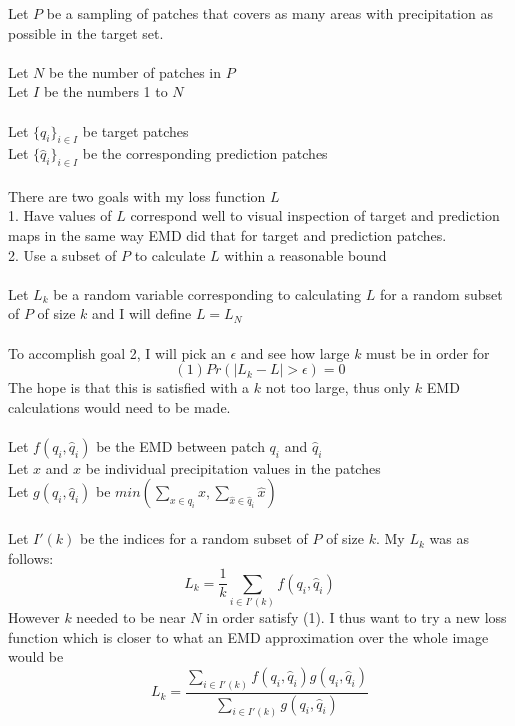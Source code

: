 \documentclass[twoside,11pt]{article}
\theoremstyle{definition}
\begin{document}
Let $P$ be a sampling of patches that covers as many areas with precipitation as possible in the target set. \\
\\
Let $N$ be the number of patches in $P$\\
Let $I$ be the numbers 1 to $N$\\
\\
Let $\{q_i\}_{i \in I}$ be target patches\\
Let $\{\hat{q}_i\}_{i \in I}$ be the corresponding prediction patches\\
\\
There are two goals with my loss function $L$\\
1. Have values of $L$ correspond well to visual inspection of target and prediction maps in the same way EMD did that for target and prediction patches.\\
2. Use a subset of $P$ to calculate $L$ within a reasonable bound\\
\\
Let $L_k$ be a random variable corresponding to calculating $L$ for a random subset of $P$ of size $k$ and I will define $L=L_N$\\
\\
To accomplish goal 2, I will pick an $\epsilon$ and see how large $k$ must be in order for
\[
(1) Pr( |L_k-L| > \epsilon) = 0
\]
The hope is that this is satisfied with a $k$ not too large, thus only $k$ EMD calculations would need to be made.\\
\\
Let $f(q_i,\hat{q}_i)$ be the EMD between patch $q_i$ and $\hat{q}_i$\\
Let $x$ and $\hat{x}$ be individual precipitation values in the patches\\
Let $g(q_i,\hat{q}_i)$ be $min(\sum_{x \in q_i}{x},\sum_{\hat{x} \in \hat{q}_i}{\hat{x}})$\\
\\
Let $I'(k)$ be the indices for a random subset of $P$ of size $k$. My $L_k$ was as follows:
\[
L_k = \frac{1}{k} \sum_{i \in I'(k)}{f(q_i,\hat{q}_i)}
\]
However $k$ needed to be near $N$ in order satisfy (1). I thus want to try a new loss function which is closer to what an EMD approximation over the whole image would be
\[
L_k = \frac{\sum_{i \in I'(k)}{f(q_i,\hat{q}_i)g(q_i,\hat{q}_i)}}{\sum_{i \in I'(k)}{g(q_i,\hat{q}_i)}} 
\]
\end{document}
